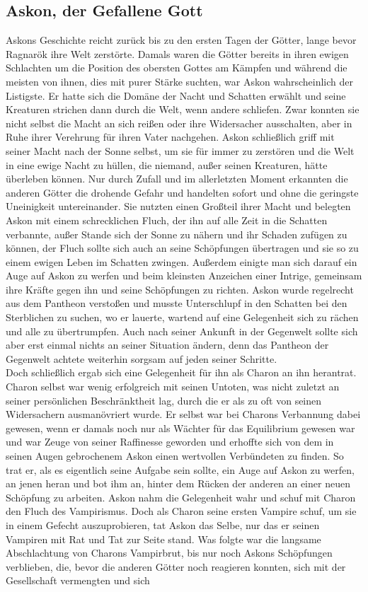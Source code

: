 \documentclass[a4paper,12pt,oneside]{book}
\begin{document}
\subsection{Askon, der Gefallene Gott}\label{Askon}
Askons Geschichte reicht zurück bis zu den ersten Tagen der Götter, lange bevor Ragnarök ihre Welt zerstörte. Damals waren die Götter bereits in ihren ewigen Schlachten um die Position des obersten Gottes am Kämpfen und während die meisten von ihnen, dies mit purer Stärke suchten, war Askon wahrscheinlich der Listigste. Er hatte sich die Domäne der Nacht und Schatten erwählt und seine Kreaturen strichen dann durch die Welt, wenn andere schliefen. Zwar konnten sie nicht selbst die Macht an sich reißen oder ihre Widersacher ausschalten, aber in Ruhe ihrer Verehrung für ihren Vater nachgehen. Askon schließlich griff mit seiner Macht nach der Sonne selbst, um sie für immer zu zerstören und die Welt in eine ewige Nacht zu hüllen, die niemand, außer seinen Kreaturen, hätte überleben können. Nur durch Zufall und im allerletzten Moment erkannten die anderen Götter die drohende Gefahr und handelten sofort und ohne die geringste Uneinigkeit untereinander. Sie nutzten einen Großteil ihrer Macht und belegten Askon mit einem schrecklichen Fluch, der ihn auf alle Zeit in die Schatten verbannte, außer Stande sich der Sonne zu nähern und ihr Schaden zufügen zu können, der Fluch sollte sich auch an seine Schöpfungen übertragen und sie so zu einem ewigen Leben im Schatten zwingen. Außerdem einigte man sich darauf ein Auge auf Askon zu werfen und beim kleinsten Anzeichen einer Intrige, gemeinsam ihre Kräfte gegen ihn und seine Schöpfungen zu richten. Askon wurde regelrecht aus dem Pantheon verstoßen und musste Unterschlupf in den Schatten bei den Sterblichen zu suchen, wo er lauerte, wartend auf eine Gelegenheit sich zu rächen und alle zu übertrumpfen. Auch nach seiner Ankunft in der Gegenwelt sollte sich aber erst einmal nichts an seiner Situation ändern, denn das Pantheon der Gegenwelt achtete weiterhin sorgsam auf jeden seiner Schritte.\\Doch schließlich ergab sich eine Gelegenheit für ihn als Charon an ihn herantrat. Charon selbst war wenig erfolgreich mit seinen Untoten, was nicht zuletzt an seiner persönlichen Beschränktheit lag, durch die er als zu oft von seinen Widersachern ausmanövriert wurde. Er selbst war bei Charons Verbannung dabei gewesen, wenn er damals noch nur als Wächter für das Equilibrium gewesen war und war Zeuge von seiner Raffinesse geworden und erhoffte sich von dem in seinen Augen gebrochenem Askon einen wertvollen Verbündeten zu finden. So trat er, als es eigentlich seine Aufgabe sein sollte, ein Auge auf Askon zu werfen, an jenen heran und bot ihm an, hinter dem Rücken der anderen an einer neuen Schöpfung zu arbeiten. Askon nahm die Gelegenheit wahr und schuf mit Charon den Fluch des Vampirismus. Doch als Charon seine ersten Vampire schuf, um sie in einem Gefecht auszuprobieren, tat Askon das Selbe, nur das er seinen Vampiren mit Rat und Tat zur Seite stand. Was folgte war die langsame Abschlachtung von Charons Vampirbrut, bis nur noch Askons Schöpfungen verblieben, die, bevor die anderen Götter noch reagieren konnten, sich mit der Gesellschaft vermengten und sich 
\end{document}
